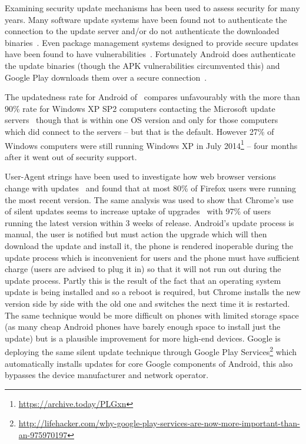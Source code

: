 \documentclass[conference,a4paper,twoside]{IEEEtran}
\let\OldTodo\todo
\renewcommand{\todo}{\OldTodo[inline]}
\newcommand{\todolater}[1]{}%
\begin{document}
Examining security update mechanisms has been used to assess security for many years.
Many software update systems have been found not to authenticate the connection to the update server and/or do not authenticate the downloaded binaries~\cite{Bellissimo2006}.
Even package management systems designed to provide secure updates have been found to have vulnerabilities~\cite{Cappos2008}.
Fortunately Android does authenticate the update binaries (though the APK vulnerabilities circumvented this) and Google Play downloads them over a secure connection~\cite{Viennot2014}.

The updatedness rate for Android of \daUpdatednessPerc\ compares unfavourably with the more than 90\% rate for Windows XP SP2 computers contacting the Microsoft update servers~\cite{Gkantsidis2006} though that is within one OS version and only for those computers which did connect to the servers -- but that is the default.
However 27\% of Windows computers were still running Windows XP in July 2014\footnote{\url{https://archive.today/PLGxn}\todolater{Get updated figures before publication}} -- four months after it went out of security support.

User-Agent strings have been used to investigate how web browser versions change with updates~\cite{Frei2008} and found that at most 80\% of Firefox users were running the most recent version.
The same analysis was used to show that Chrome's use of silent updates seems to increase uptake of upgrades~\cite{Duebendorfer2010} with 97\% of users running the latest version within 3 weeks of release.
Android's update process is manual, the user is notified but must action the upgrade which will then download the update and install it, the phone is rendered inoperable during the update process which is inconvenient for users and the phone must have sufficient charge (users are advised to plug it in) so that it will not run out during the update process.
Partly this is the result of the fact that an operating system update is being installed and so a reboot is required, but Chrome installs the new version side by side with the old one and switches the next time it is restarted.
The same technique would be more difficult on phones with limited storage space (as many cheap Android phones have barely enough space to install just the update) but is a plausible improvement for more high-end devices.
Google is deploying the same silent update technique through Google Play Services\footnote{\href{http://lifehacker.com/why-google-play-services-are-now-more-important-than-an-975970197}{http://lifehacker.com/why-google-play-services-are-now-more-important-than-an-975970197}} which automatically installs updates for core Google components of Android, this also bypasses the device manufacturer and network operator.
\end{document}

